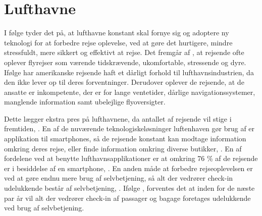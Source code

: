 \section{Lufthavne}
\label{Lufthavne}
%
I følge \textcite[s. 203]{PDF:FutureAirportTerminals} tyder det på, at lufthavne konstant skal fornye sig og adoptere ny teknologi for at forbedre rejse oplevelse, ved at gøre det hurtigere, mindre stressfuldt, mere sikkert og effektivt at rejse. Det fremgår af \textcite[s. 203]{PDF:FutureAirportTerminals}, at rejsende ofte oplever flyrejser som værende tidskrævende, ukomfortable, stressende og dyre. Ifølge \textcite[s. 351]{PDF:TheImpactOfTraveler} har amerikanske rejsende haft et dårligt forhold til lufthavnsindustrien, da den ikke lever op til deres forventninger. Derudover oplever de rejsende, at de ansatte er inkompetente, der er for lange ventetider, dårlige navigationssystemer, manglende information samt ubelejlige flyoversigter. 

Dette lægger ekstra pres på lufthavnene, da antallet af rejsende vil stige i fremtiden, \textcite[s. 203]{PDF:FutureAirportTerminals}. En af de nuværende teknologiskeløsninger luftenhaven gør brug af er applikation til smartphones, så de rejsende konstant kan modtage information omkring deres rejse, eller finde information omkring diverse butikker, \parencite[s. 203]{PDF:FutureAirportTerminals}. En af fordelene ved at benytte lufthavnsapplikationer er at omkring 76 \% af de rejsende er i besiddelse af en smartphone, \parencite[s. 203]{PDF:FutureAirportTerminals}. En anden måde at forbedre rejseoplevelsen er ved at gøre endnu mere brug af selvbetjening, så alt der vedrører check-in udelukkende består af selvbetjening, \parencite[s. 205]{PDF:FutureAirportTerminals}. Ifølge \textcite[s. 351]{PDF:TheImpactOfTraveler}, forventes det at inden for de næste par år vil alt der vedrører check-in af passager og bagage foretages udelukkende ved brug af selvbetjening.

